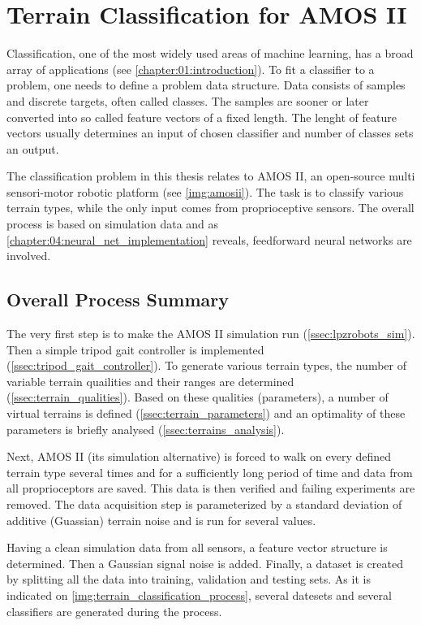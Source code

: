 \chapter{Terrain Classification for AMOS II} \label{chapter:05:terrain_classification}
Classification, one of the most widely used areas of machine learning, has a broad array of applications (see \cref{chapter:01:introduction}). To fit a classifier to a problem, one needs to define a problem data structure. Data consists of samples and discrete targets, often called classes. The samples are sooner or later converted into so called feature vectors of a fixed length. The lenght of feature vectors usually determines an input of chosen classifier and number of classes sets an output.

The classification problem in this thesis relates to AMOS II, an open-source multi sensori-motor robotic platform (see \cref{img:amosii}). The task is to classify various terrain types, while the only input comes from proprioceptive sensors. The overall process is based on simulation data and as \cref{chapter:04:neural_net_implementation} reveals, feedforward neural networks are involved.

\section{Overall Process Summary}
The very first step is to make the AMOS II simulation run (\cref{ssec:lpzrobots_sim}). Then a simple tripod gait controller is implemented (\cref{ssec:tripod_gait_controller}). To generate various terrain types, the number of variable terrain quailities and their ranges are determined (\cref{ssec:terrain_qualities}). Based on these qualities (parameters), a number of virtual terrains is defined (\cref{ssec:terrain_parameters}) and an optimality of these parameters is briefly analysed (\cref{ssec:terrains_analysis}).

Next, AMOS II (its simulation alternative) is forced to walk on every defined terrain type several times and for a sufficiently long period of time and data from all proprioceptors are saved. This data is then verified and failing experiments are removed. The data acquisition step is parameterized by a standard deviation of additive (Guassian) terrain noise and is run for several values.

Having a clean simulation data from all sensors, a feature vector structure is determined. Then a Gaussian signal noise is added. Finally, a dataset is created by splitting all the data into training, validation and testing sets. As it is indicated on \cref{img:terrain_classification_process}, several datesets and several classifiers are generated during the process. 

